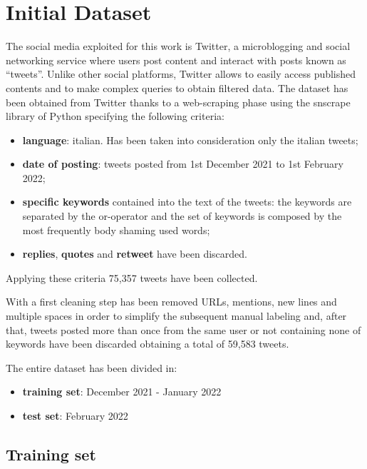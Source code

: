 \section{Initial Dataset}

The social media exploited for this work is Twitter, a microblogging and social networking service where users post content and interact with posts known as “tweets”. Unlike other social platforms, Twitter allows to easily access published contents and to make complex queries to obtain filtered data.
The dataset has been obtained from Twitter thanks to a web-scraping phase using the snscrape library of Python specifying the following criteria: 
\begin{itemize}
\item \textbf{language}: italian. Has been taken into consideration only the italian tweets;
\item \textbf{date of posting}: tweets posted from 1st December 2021 to 1st February 2022; 
\item \textbf{specific keywords} contained into the text of the tweets: the keywords are separated by the or-operator and the set of keywords is composed by the most frequently body shaming used words;
\item \textbf{replies}, \textbf{quotes} and \textbf{retweet} have been discarded. 
\end{itemize}

\noindent
Applying these criteria 75,357 tweets have been collected.

\vspace{5mm}

\noindent
With a first cleaning step has been removed URLs, mentions, new lines and multiple spaces in order to simplify the subsequent manual labeling and, after that, tweets posted more than once from the same user or not containing none of keywords have been discarded obtaining a total of 59,583 tweets.

\vspace{5mm}

\noindent
The entire dataset has been divided in:
\begin{itemize}
    \item \textbf{training set}: December 2021 - January 2022
    \item \textbf{test set}: February 2022
\end{itemize}

\subsection{Training set}

